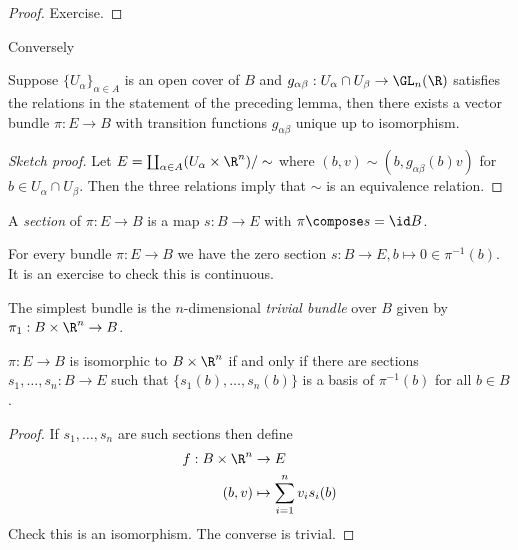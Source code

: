 \documentclass[a4paper]{article}
\begin{document}
\begin{proof}
  Exercise.
\end{proof}

Conversely

\begin{proposition}
  Suppose \(\{U_\alpha\}_{\alpha \in A}\) is an open cover of \(B\) and \(g_{\alpha\beta}: U_\alpha \cap U_\beta \to \GL_n(\R)\) satisfies the relations in the statement of the preceding lemma, then there exists a vector bundle \(\pi: E \to B\) with transition functions \(g_{\alpha\beta}\) unique up to isomorphism.
\end{proposition}

\begin{proof}[Sketch proof]
  Let \(E = \coprod_{\alpha \in A} (U_\alpha \times \R^n)/\sim\) where \((b, v) \sim (b, g_{\alpha\beta}(b) v)\) for \(b \in U_\alpha \cap U_\beta\). Then the three relations imply that \(\sim\) is an equivalence relation.
\end{proof}

\begin{definition}[section]
  A \emph{section} of \(\pi: E \to B\) is a map \(s: B \to E\) with \(\pi \compose s = \id B\).
\end{definition}

\begin{eg}
  For every bundle \(\pi: E \to B\) we have the zero section \(s: B \to E, b \mapsto 0 \in \pi^{-1}(b)\). It is an exercise to check this is continuous.
\end{eg}

The simplest bundle is the \(n\)-dimensional \emph{trivial bundle} over \(B\) given by \(\pi_1: B \times \R^n \to B\).

\begin{proposition}
  \(\pi: E \to B\) is isomorphic to \(B \times \R^n\) if and only if there are sections \(s_1, \dots, s_n: B \to E\) such that \(\{s_1(b), \dots, s_n(b)\}\) is a basis of \(\pi^{-1}(b)\) for all \(b \in B\).
\end{proposition}

\begin{proof}
  If \(s_1, \dots, s_n\) are such sections then define
  \begin{align*}
    f: B \times \R^n &\to E \\
    (b, v) &\mapsto \sum_{i = 1}^n v_i s_i(b)
  \end{align*}
  Check this is an isomorphism. The converse is trivial.
\end{proof}
\end{document}
